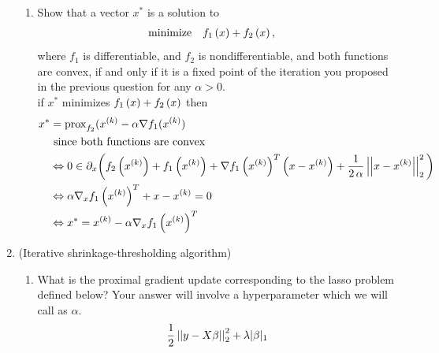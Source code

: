 \documentclass[12pt,twoside]{article}
\begin{document}
\begin{enumerate}
\begin{enumerate}
\item Show that a vector $x^{\ast}$ is a solution to
\begin{align}
 \operatorname{minimize} \quad & f_1\left( x \right) + f_2\left( x \right),
\end{align}
where $f_1$ is differentiable, and $f_2$ is nondifferentiable, and both functions are convex, if and only if it is a fixed point of the iteration you proposed in the previous question for any $\alpha > 0$.\\
if $x^{\ast}$ minimizes $f_1\left( x \right) + f_2\left( x \right)$  then
\begin{align*}
	x^{\ast} &= \operatorname{prox}_{f_2} (x^{(k)}  - \alpha \nabla f_1 (x^{(k)}) \\
	& \text{ since both functions are convex } \\
	& \Leftrightarrow 0 \in \partial_x \bigg( f_2\left( x^{(k)} \right) + f_1\left( x^{(k)} \right) + \nabla f_1\left( x^{(k)} \right)^T\left( x-x^{(k)} \right) +  \frac{1}{2 \, \alpha }\left|\left| x-x^{(k)} \right|\right| _{2}^2 \bigg) \\
	& \Leftrightarrow \alpha  \nabla_x f_1\left( x^{(k)} \right)^T + x - x^{(k)} = 0 \\
	& \Leftrightarrow  x^{\ast} =  x^{(k)}  - \alpha \nabla_x f_1\left( x^{(k)} \right)^T  \\
\end{align*}


  \end{enumerate}
  
  \newpage
  \item (Iterative shrinkage-thresholding algorithm)   
 \begin{enumerate}
 \item What is the proximal gradient update corresponding to the lasso problem defined below? Your answer will involve a hyperparameter which we will call as $\alpha$. 
 \begin{align*}
 \frac{1}{2} \left|\left| y - X\beta \right|\right| _{2}^2 + \lambda |\beta|_1
 \end{align*}
 

\end{enumerate}
\end{enumerate}
\end{document}
